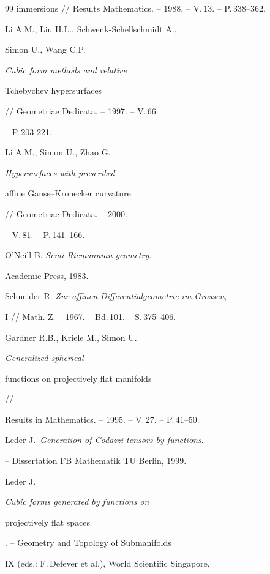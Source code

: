 \begin{thebibliography}{99}
{immersions} // Results Mathematics. -- 1988. -- V.\,13. -- P.\,338--362.




Li A.M., Liu H.L., Schwenk-Schellschmidt A.,

Simon U., Wang C.P. {\it Cubic form methods and relative

Tchebychev hypersurfaces} // Geometriae Dedicata. -- 1997. -- V.\,66.

-- P.\,203-221.




Li A.M., Simon U., Zhao G. {\it Hypersurfaces with prescribed

affine Gauss--Kronecker curvature} // Geometriae Dedicata. -- 2000.

-- V.\,81. -- P.\,141--166.




O'Neill B. {\it Semi-Riemannian geometry}. --

Academic Press, 1983.




Schneider R. {\it Zur affinen Differentialgeometrie im Grossen},

I // Math. Z. -- 1967. -- Bd.\,101. -- S.\,375--406.




Gardner R.B., Kriele M., Simon U. {\it Generalized spherical

functions on projectively flat manifolds} //

Results in Mathematics. -- 1995. -- V.\,27. -- P.\,41--50.




Leder J.\, {\it Generation of Codazzi tensors by functions}.

-- Dissertation FB Mathematik TU Berlin, 1999.




Leder J. {\it Cubic forms generated by functions on

projectively flat spaces}. -- Geometry and Topology of Submanifolds

IX (eds.: F.\,Defever et al.), World Scientific Singapore,


\end{thebibliography}
